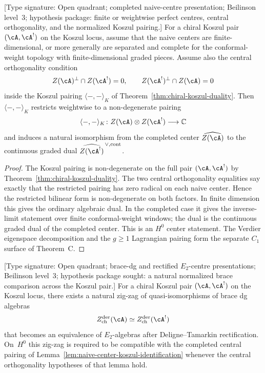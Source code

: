 \begin{lemma}
\label{lem:naive-center-koszul-identification}
%
\textup{[Type signature: Open quadrant; completed naive-centre
presentation; Beilinson level~\(3\); hypothesis package: finite or
weightwise perfect centres, central orthogonality, and the normalized
Koszul pairing.]}
For a chiral Koszul pair $(\cA, \cA^!)$ on the Koszul locus, assume
that the naive centers are finite-dimensional, or more generally are
separated and complete for the conformal-weight topology with
finite-dimensional graded pieces. Assume also the central
orthogonality condition
\[
 Z(\cA)^\perp \cap Z(\cA^!) = 0,
 \qquad
 Z(\cA^!)^\perp \cap Z(\cA) = 0
\]
inside the Koszul pairing $\langle -, - \rangle_K$ of
Theorem~\ref{thm:chiral-koszul-duality}. Then
$\langle -, - \rangle_K$ restricts weightwise to a non-degenerate
pairing
\[
 \langle -, - \rangle_K \colon Z(\cA) \otimes Z(\cA^!)
 \longrightarrow \mathbb{C}
\]
and induces a natural isomorphism from the completed center
$\widehat{Z(\cA)}$ to the continuous graded dual
$\widehat{Z(\cA^!)}^{\,\vee,\mathrm{cont}}$.
\end{lemma}

\begin{proof}
The Koszul pairing is non-degenerate on the full pair
$(\cA, \cA^!)$ by Theorem~\ref{thm:chiral-koszul-duality}. The two
central orthogonality equalities say exactly that the restricted
pairing has zero radical on each naive center. Hence the restricted
bilinear form is non-degenerate on both
factors. In finite dimension this gives the ordinary algebraic dual.
In the completed case it gives the inverse-limit statement over
finite conformal-weight windows; the dual is the continuous graded
dual of the completed center. This is an $H^0$ center statement.  The
Verdier eigenspace decomposition and the $g\geq1$ Lagrangian pairing
form the separate $C_1$ surface of Theorem~C.
\end{proof}

\begin{conjecture}
\label{conj:derived-center-koszul-equivalence}%
\ClaimStatusConjectured
{}%
\textup{[Type signature: Open quadrant; brace-dg and rectified
\(E_2\)-centre presentations; Beilinson level~\(3\); hypothesis
package sought: a natural normalized brace comparison across the
Koszul pair.]}
For a chiral Koszul pair $(\cA, \cA^!)$ on the Koszul locus, there
exists a natural zig-zag of quasi-isomorphisms of brace dg algebras
\[
 Z^{\mathrm{der}}_{\mathrm{ch}}(\cA) \simeq
 Z^{\mathrm{der}}_{\mathrm{ch}}(\cA^!)
\]
that becomes an equivalence of $E_2$-algebras after Deligne--Tamarkin
rectification. On~$H^0$ this zig-zag is required to be compatible
with the completed central pairing of
Lemma~\ref{lem:naive-center-koszul-identification} whenever the
central orthogonality hypotheses of that lemma hold.
\end{conjecture}

